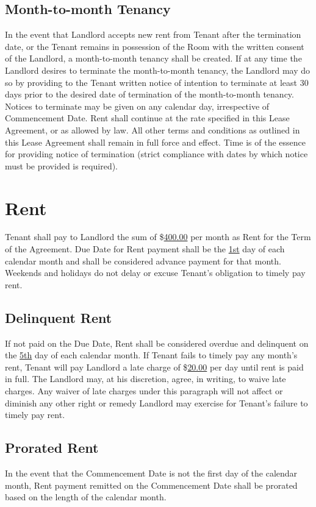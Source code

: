 \documentclass{amsart}
\begin{document}
\subsection{Month-to-month Tenancy}
In the event that Landlord accepts new rent from Tenant after the termination
date, or the Tenant remains in possession of the Room with the written consent
of the Landlord, a month-to-month tenancy shall be created. If at any time the
Landlord desires to terminate the month-to-month tenancy, the Landlord may do so
by providing to the Tenant written notice of intention to terminate at least
30 days prior to the desired date of termination of the month-to-month tenancy.
Notices to terminate may be given on any calendar day, irrespective of
Commencement Date. Rent shall continue at the rate specified in this Lease
Agreement, or as allowed by law. All other terms and conditions as outlined in
this Lease Agreement shall remain in full force and effect. Time is of the
essence for providing notice of termination (strict compliance with dates by
which notice must be provided is required).
\section{Rent}
Tenant shall pay to Landlord the sum of \$\underline{400.00} per month as Rent
for the Term of the Agreement. Due Date for Rent payment shall be the
\underline{1st} day of each calendar month and shall be considered advance
payment for that month.  Weekends and holidays do not delay or excuse Tenant's
obligation to timely pay rent.
\subsection{Delinquent Rent}
If not paid on the Due Date, Rent shall be considered overdue and delinquent on
the \underline{5th} day of each calendar month. If Tenant fails to timely pay
any month's rent, Tenant will pay Landlord a late charge of \$\underline{20.00}
per day until rent is paid in full. The Landlord may, at his discretion, agree,
in writing, to waive late charges. Any waiver of late charges under this
paragraph will not affect or diminish any other right or remedy Landlord may
exercise for Tenant's failure to timely pay rent.
\subsection{Prorated Rent}
In the event that the Commencement Date is not the first day of the calendar month,
Rent payment remitted on the Commencement Date shall be prorated based on the
length of the calendar month.
\end{document}

